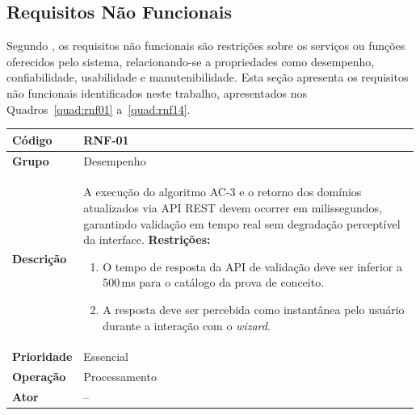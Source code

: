 \subsection{Requisitos Não Funcionais}

Segundo \textcite{sommerville2011}, os requisitos não funcionais são restrições
sobre os serviços ou funções oferecidos pelo sistema, relacionando-se a
propriedades como desempenho, confiabilidade, usabilidade e manutenibilidade.
Esta seção apresenta os requisitos não funcionais identificados neste trabalho,
apresentados nos Quadros~\ref{quad:rnf01} a~\ref{quad:rnf14}.

\FloatBarrier
\begin{quadro}[htb]
  \caption{RNF-01 -- Tempo de resposta da validação}
  \label{quad:rnf01}
  \begin{tabular}{|p{3.2cm}|p{11.8cm}|}
    \hline
    \textbf{Código}     & RNF-01                                                                                     \\ \hline
    \textbf{Grupo}      & Desempenho                                                                                 \\ \hline
    \textbf{Descrição}  &
    A execução do algoritmo AC-3 e o retorno dos domínios atualizados via API REST devem ocorrer em milissegundos, garantindo validação em tempo real sem degradação perceptível da interface.
    \textbf{Restrições:}
    \begin{enumerate}[nosep,leftmargin=1.2em,topsep=2pt,partopsep=0pt,parsep=0pt,itemsep=1pt]
      \item O tempo de resposta da API de validação deve ser inferior a 500\,ms para o catálogo da prova de conceito.
      \item A resposta deve ser percebida como instantânea pelo usuário durante a interação com o \textit{wizard}.
    \end{enumerate} \\ \hline
    \textbf{Prioridade} & Essencial                                                                                  \\ \hline
    \textbf{Operação}   & Processamento                                                                              \\ \hline
    \textbf{Ator}       & --                                                                                         \\ \hline
  \end{tabular}
\end{quadro}

